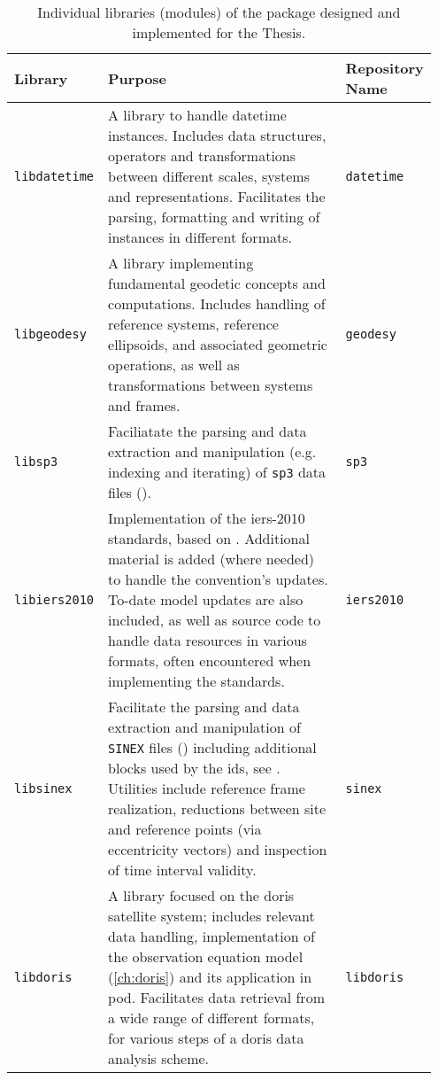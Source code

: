 \begin{table}[h!]
  \centering
  \begin{tabular}{p{0.20\linewidth} | p{0.60\linewidth} | p{0.15\linewidth}}
    \textbf{Library} & \textbf{Purpose} & \textbf{Repository Name} \\
    \toprule
    
    \texttt{libdatetime} & A library to handle datetime instances. Includes data structures, 
      operators and transformations between different scales, systems and representations. 
      Facilitates the parsing, formatting and writing of instances in different formats.
      & \texttt{datetime} \\
    
    \texttt{libgeodesy} & A library implementing fundamental geodetic concepts and 
      computations. Includes handling of reference systems, reference ellipsoids, 
      and associated geometric operations, as well as transformations between 
      systems and frames. & \texttt{geodesy} \\

    \texttt{libsp3} & Faciliatate the parsing and data extraction and manipulation 
      (e.g. indexing and iterating) of \texttt{sp3} data files (\cite{Hilla2010}). 
      & \texttt{sp3} \\
    
    \texttt{libiers2010} & Implementation of the \gls{iers}-2010 standards, based on  
      \cite{iers2010}. Additional material is added (where needed) to handle the 
      convention's updates. To-date model updates are also included, as well as 
      source code to handle data resources in various formats, often encountered 
      when implementing the standards.
      & \texttt{iers2010} \\
    
    \texttt{libsinex} & Facilitate the parsing and data extraction and manipulation 
      of \texttt{SINEX} files (\cite{Sinex202}) including additional blocks 
      used by the \gls{ids}, see \cite{Moreaux2023}. Utilities include reference 
      frame realization, reductions between site and reference points (via eccentricity 
      vectors) and inspection of time interval validity.
      & \texttt{sinex} \\
    
    \texttt{libdoris} & A library focused on the \gls{doris} satellite system; includes 
      relevant data handling, implementation of the observation equation model 
      (\autoref{ch:doris}) and its application in \gls{pod}. Facilitates data 
      retrieval from a wide range of different formats, for various steps of a
      \gls{doris} data analysis scheme.
      & \texttt{libdoris} \\
      \bottomrule
  \end{tabular}
  \caption{Individual libraries (modules) of the package designed and implemented for the Thesis.}
  \label{table:software-components2}
\end{table}

